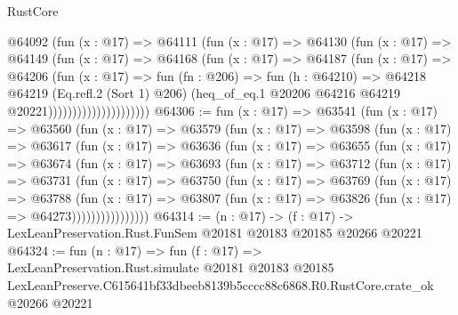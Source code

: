 \begin{lexlean}{RustCore}
\begin{coremodule}
                            @64092
                              (fun (x : @17) =>
                              @64111
                                (fun (x : @17) =>
                                @64130
                                  (fun (x : @17) =>
                                  @64149
                                    (fun (x : @17) =>
                                    @64168
                                      (fun (x : @17) =>
                                      @64187
                                        (fun (x : @17) =>
                                        @64206
                                          (fun (x : @17) =>
                                          fun (fn : @206) =>
                                          fun (h : @64210) =>
                                          @64218
                                            @64219
                                            (Eq.refl.{2} (Sort 1) @206)
                                            (heq_of_eq.{1}
                                              @20206
                                              @64216
                                              @64219
                                              @20221)))))))))))))))))))))
@64306 := fun (x : @17) =>
  @63541
    (fun (x : @17) =>
    @63560
      (fun (x : @17) =>
      @63579
        (fun (x : @17) =>
        @63598
          (fun (x : @17) =>
          @63617
            (fun (x : @17) =>
            @63636
              (fun (x : @17) =>
              @63655
                (fun (x : @17) =>
                @63674
                  (fun (x : @17) =>
                  @63693
                    (fun (x : @17) =>
                    @63712
                      (fun (x : @17) =>
                      @63731
                        (fun (x : @17) =>
                        @63750
                          (fun (x : @17) =>
                          @63769
                            (fun (x : @17) =>
                            @63788
                              (fun (x : @17) =>
                              @63807
                                (fun (x : @17) => @63826 (fun (x : @17) => @64273))))))))))))))))
@64314 := (n : @17) ->
  (f : @17) -> LexLeanPreservation.Rust.FunSem @20181 @20183 @20185 @20266 @20221
@64324 := fun (n : @17) =>
  fun (f : @17) =>
  LexLeanPreservation.Rust.simulate
    @20181
    @20183
    @20185
    LexLeanPreserve.C615641bf33dbeeb8139b5cccc88c6868.R0.RustCore.crate_ok
    @20266
    @20221
\end{coremodule}
\end{lexlean}
